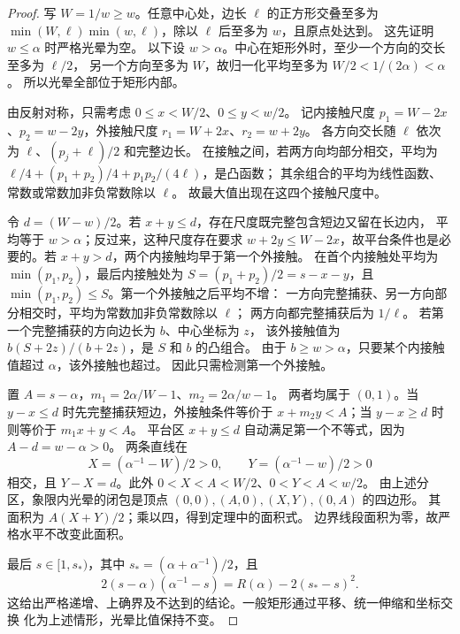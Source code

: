 \begin{proof}
写 $W=1/w\ge w$。任意中心处，边长 $\ell$ 的正方形交叠至多为
$\min(W,\ell)\min(w,\ell)$，除以 $\ell$ 后至多为 $w$，且原点处达到。
这先证明 $w\le\alpha$ 时严格光晕为空。
以下设 $w>\alpha$。中心在矩形外时，至少一个方向的交长至多为 $\ell/2$，
另一个方向至多为 $W$，故归一化平均至多为 $W/2<1/(2\alpha)<\alpha$。
所以光晕全部位于矩形内部。

由反射对称，只需考虑 $0\le x<W/2$、$0\le y<w/2$。
记内接触尺度 $p_1=W-2x$、$p_2=w-2y$，外接触尺度
$r_1=W+2x$、$r_2=w+2y$。
各方向交长随 $\ell$ 依次为 $\ell$、$(p_j+\ell)/2$ 和完整边长。
在接触之间，若两方向均部分相交，平均为
$\ell/4+(p_1+p_2)/4+p_1p_2/(4\ell)$，是凸函数；
其余组合的平均为线性函数、常数或常数加非负常数除以 $\ell$。
故最大值出现在这四个接触尺度中。

令 $d=(W-w)/2$。若 $x+y\le d$，存在尺度既完整包含短边又留在长边内，
平均等于 $w>\alpha$；反过来，这种尺度存在要求 $w+2y\le W-2x$，故平台条件也是必要的。若 $x+y>d$，两个内接触均早于第一个外接触。
在首个内接触处平均为 $\min(p_1,p_2)$，最后内接触处为
$S=(p_1+p_2)/2=s-x-y$，且 $\min(p_1,p_2)\le S$。第一个外接触之后平均不增：
一方向完整捕获、另一方向部分相交时，平均为常数加非负常数除以 $\ell$；
两方向都完整捕获后为 $1/\ell$。
若第一个完整捕获的方向边长为 $b$、中心坐标为 $z$，
该外接触值为 $b(S+2z)/(b+2z)$，是 $S$ 和 $b$ 的凸组合。
由于 $b\ge w>\alpha$，只要某个内接触值超过 $\alpha$，该外接触也超过。
因此只需检测第一个外接触。

置 $A=s-\alpha$，$m_1=2\alpha/W-1$、$m_2=2\alpha/w-1$。
两者均属于 $(0,1)$。当 $y-x\le d$ 时先完整捕获短边，外接触条件等价于
$x+m_2y<A$；当 $y-x\ge d$ 时则等价于 $m_1x+y<A$。
平台区 $x+y\le d$ 自动满足第一个不等式，因为 $A-d=w-\alpha>0$。
两条直线在
\[
 X=(\alpha^{-1}-W)/2>0,\qquad Y=(\alpha^{-1}-w)/2>0
\]
相交，且 $Y-X=d$。此外 $0<X<A<W/2$、$0<Y<A<w/2$。
由上述分区，象限内光晕的闭包是顶点
$(0,0),(A,0),(X,Y),(0,A)$ 的四边形。
其面积为 $A(X+Y)/2$；乘以四，得到定理中的面积式。
边界线段面积为零，故严格水平不改变此面积。

最后 $s\in[1,s_*)$，其中 $s_*=(\alpha+\alpha^{-1})/2$，且
\begin{equation}\label{rect:deficit}
 2(s-\alpha)(\alpha^{-1}-s)=R(\alpha)-2(s_*-s)^2.
\end{equation}
这给出严格递增、上确界及不达到的结论。一般矩形通过平移、统一伸缩和坐标交换
化为上述情形，光晕比值保持不变。
\end{proof}

